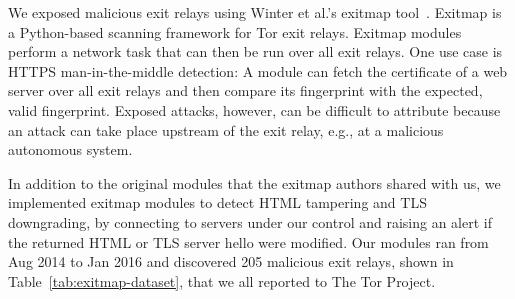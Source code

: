 We exposed malicious exit relays using Winter et al.'s exitmap tool~\cite[\S
3.1]{Winter2014a}.  Exitmap is a Python-based scanning framework for Tor exit
relays.  Exitmap modules perform a network task that can then be run over all
exit relays.  One use case is HTTPS man-in-the-middle detection: A module can
fetch the certificate of a web server over all exit relays and then compare its
fingerprint with the expected, valid fingerprint.  Exposed attacks, however, can
be difficult to attribute because an attack can take place upstream of the exit
relay, e.g., at a malicious autonomous system.

In addition to the original modules that the exitmap authors shared with us, we
implemented exitmap modules to detect HTML tampering and TLS downgrading, by
connecting to servers under our control and raising an alert if the returned
HTML or TLS server hello were modified.  Our modules ran from Aug 2014 to Jan
2016 and discovered 205 malicious exit relays, shown in
Table~\ref{tab:exitmap-dataset}, that we all reported to The Tor Project.

